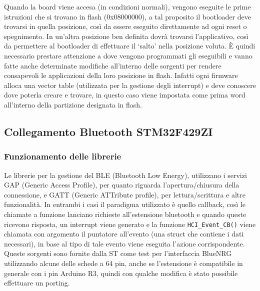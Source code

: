 Quando la board viene accesa (in condizioni normali), vengono eseguite le prime istruzioni che si trovano in flash (0x08000000), a tal proposito il bootloader deve trovarsi in quella posizione, cos\`i da essere eseguito direttamente ad ogni reset o spegnimento. In un'altra posizione ben definita dovr\`a trovarsi l'applicativo, cos\`i da permettere al bootloader di effettuare il `salto' nella posizione voluta. \`E quindi necessario prestare attenzione a dove vengono programmati gli eseguibili e vanno fatte anche determinate modifiche all'interno delle sorgenti per rendere consapevoli le applicazioni della loro posizione in flash. Infatti ogni firmware alloca una vector table (utilizzata per la gestione degli interrupt) e deve conoscere dove poterla creare e trovare, in questo caso viene impostata come prima word all'interno della partizione designata in flash.

\subsection{Collegamento Bluetooth STM32F429ZI}

\subsubsection{Funzionamento delle librerie}

Le librerie per la gestione del BLE (Bluetooth Low Energy), utilizzano i servizi GAP (Generic Access Profile), per quanto riguarda l'apertura/chiusura della connessione, e GATT (Generic ATTribute profile), per lettura/scrittura e altre funzionalit\`a. In entrambi i casi il paradigma utilizzato \`e quello callback, cos\`i le chiamate a funzione lanciano richieste all'estensione bluetooth e quando queste ricevono risposta, un interrupt viene generato e la funzione \texttt{HCI\_Event\_CB()} viene chiamata con argomento il puntatore all'evento (una struct che contiene i dati necessari), in base al tipo di tale evento viene eseguita l'azione corrispondente. 
Queste sorgenti sono fornite dalla ST come test per l'interfaccia BlueNRG utilizzando alcune delle schede a 64 pin, anche se l'estensione \`e compatibile in generale con i pin Arduino R3, quindi con qualche modifica \`e stato possibile effettuare un porting. 

